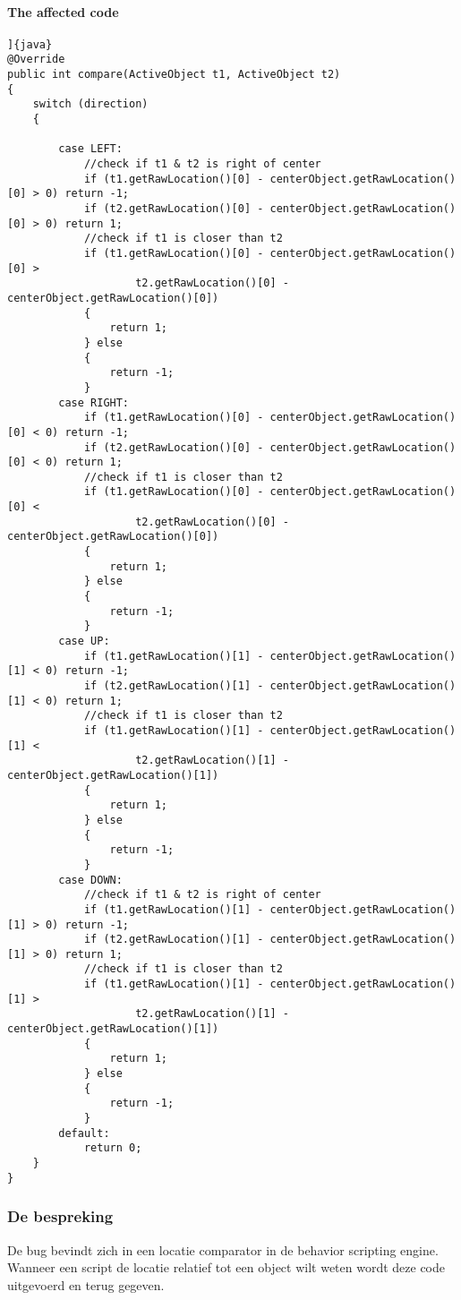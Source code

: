 \documentclass[a4paper]{article}
\begin{document}
\paragraph{The affected code}
\begin{verbatim}]{java}
@Override
public int compare(ActiveObject t1, ActiveObject t2)
{
	switch (direction)
	{

		case LEFT:
			//check if t1 & t2 is right of center
			if (t1.getRawLocation()[0] - centerObject.getRawLocation()[0] > 0) return -1;
			if (t2.getRawLocation()[0] - centerObject.getRawLocation()[0] > 0) return 1;
			//check if t1 is closer than t2
			if (t1.getRawLocation()[0] - centerObject.getRawLocation()[0] >
					t2.getRawLocation()[0] - centerObject.getRawLocation()[0])
			{
				return 1;
			} else
			{
				return -1;
			}
		case RIGHT:
			if (t1.getRawLocation()[0] - centerObject.getRawLocation()[0] < 0) return -1;
			if (t2.getRawLocation()[0] - centerObject.getRawLocation()[0] < 0) return 1;
			//check if t1 is closer than t2
			if (t1.getRawLocation()[0] - centerObject.getRawLocation()[0] <
					t2.getRawLocation()[0] - centerObject.getRawLocation()[0])
			{
				return 1;
			} else
			{
				return -1;
			}
		case UP:
			if (t1.getRawLocation()[1] - centerObject.getRawLocation()[1] < 0) return -1;
			if (t2.getRawLocation()[1] - centerObject.getRawLocation()[1] < 0) return 1;
			//check if t1 is closer than t2
			if (t1.getRawLocation()[1] - centerObject.getRawLocation()[1] <
					t2.getRawLocation()[1] - centerObject.getRawLocation()[1])
			{
				return 1;
			} else
			{
				return -1;
			}
		case DOWN:
			//check if t1 & t2 is right of center
			if (t1.getRawLocation()[1] - centerObject.getRawLocation()[1] > 0) return -1;
			if (t2.getRawLocation()[1] - centerObject.getRawLocation()[1] > 0) return 1;
			//check if t1 is closer than t2
			if (t1.getRawLocation()[1] - centerObject.getRawLocation()[1] >
					t2.getRawLocation()[1] - centerObject.getRawLocation()[1])
			{
				return 1;
			} else
			{
				return -1;
			}
		default:
			return 0;
	}
}
\end{verbatim}
\subsubsection{De bespreking}
De bug bevindt zich in een locatie comparator in de behavior scripting engine.
Wanneer een script de locatie relatief tot een object wilt weten wordt deze code uitgevoerd en terug gegeven.
\end{document}
